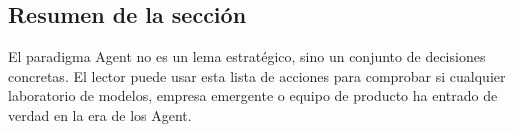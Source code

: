 \subsection{Resumen de la sección}

El paradigma Agent no es un lema estratégico, sino un conjunto de decisiones concretas. El lector puede usar esta lista de acciones para comprobar si cualquier laboratorio de modelos, empresa emergente o equipo de producto ha entrado de verdad en la era de los Agent.
